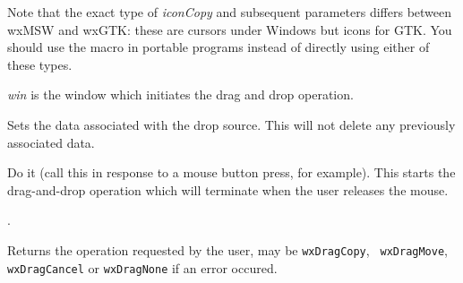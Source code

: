 Note that the exact type of {\it iconCopy} and subsequent parameters differs
between wxMSW and wxGTK: these are cursors under Windows but icons for GTK.
You should use the macro  in portable
programs instead of directly using either of these types.






{\it win} is the window which initiates the drag and drop operation.

\label{wxdropsourcedtor}


\label{wxdropsourcesetdata}


Sets the data  associated with the 
drop source. This will not delete any previously associated data.

\label{wxdropsourcedodragdrop}


Do it (call this in response to a mouse button press, for example). This starts
the drag-and-drop operation which will terminate when the user releases the
mouse.


.


Returns the operation requested by the user, may be {\tt wxDragCopy}, {\tt
wxDragMove}, {\tt wxDragCancel} or {\tt wxDragNone} if an error occured.

